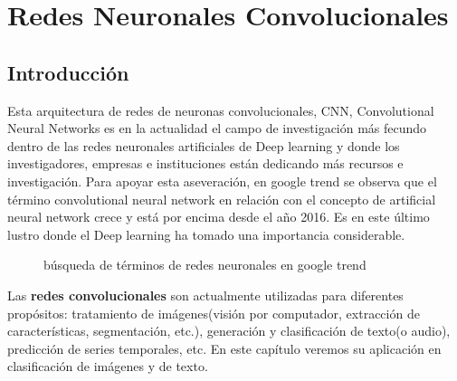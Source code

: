 \documentclass[
  a4paper,
  DIV=11,
  numbers=noendperiod]{scrreprt}
\begin{document}
\section{Redes Neuronales
Convolucionales}\label{redes-neuronales-convolucionales}

\subsection{Introducción}\label{introducciuxf3n-2}

Esta arquitectura de redes de neuronas convolucionales, CNN,
Convolutional Neural Networks es en la actualidad el campo de
investigación más fecundo dentro de las redes neuronales artificiales de
Deep learning y donde los investigadores, empresas e instituciones están
dedicando más recursos e investigación. Para apoyar esta aseveración, en
google trend se observa que el término convolutional neural network en
relación con el concepto de artificial neural network crece y está por
encima desde el año 2016. Es en este último lustro donde el Deep
learning ha tomado una importancia considerable.

\begin{figure}


\caption{\label{fig-busqueda-google}búsqueda de términos de redes
neuronales en google trend}

\end{figure}%

Las \textbf{redes convolucionales} son actualmente utilizadas para
diferentes propósitos: tratamiento de imágenes(visión por computador,
extracción de características, segmentación, etc.), generación y
clasificación de texto(o audio), predicción de series temporales, etc.
En este capítulo veremos su aplicación en clasificación de imágenes y de
texto.
\end{document}
